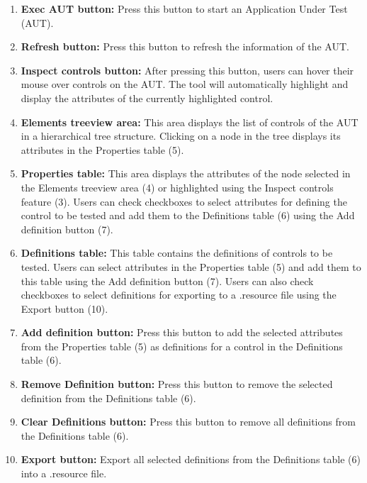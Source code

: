 \begin{enumerate}
    \item \textbf{Exec AUT button:} Press this button to start an Application Under Test (AUT).
    
    \item \textbf{Refresh button:} Press this button to refresh the information of the AUT.
    
    \item \textbf{Inspect controls button:} After pressing this button, users can hover their mouse over controls on the AUT. The tool will automatically highlight and display the attributes of the currently highlighted control.
    
    \item \textbf{Elements treeview area:} This area displays the list of controls of the AUT in a hierarchical tree structure. Clicking on a node in the tree displays its attributes in the Properties table (5).
    
    \item \textbf{Properties table:} This area displays the attributes of the node selected in the Elements treeview area (4) or highlighted using the Inspect controls feature (3). Users can check checkboxes to select attributes for defining the control to be tested and add them to the Definitions table (6) using the Add definition button (7).
    
    \item \textbf{Definitions table:} This table contains the definitions of controls to be tested. Users can select attributes in the Properties table (5) and add them to this table using the Add definition button (7). Users can also check checkboxes to select definitions for exporting to a .resource file using the Export button (10).
    
    \item \textbf{Add definition button:} Press this button to add the selected attributes from the Properties table (5) as definitions for a control in the Definitions table (6).
    
    \item \textbf{Remove Definition button:} Press this button to remove the selected definition from the Definitions table (6).
    
    \item \textbf{Clear Definitions button:} Press this button to remove all definitions from the Definitions table (6).
    
    \item \textbf{Export button:} Export all selected definitions from the Definitions table (6) into a .resource file.
\end{enumerate}

